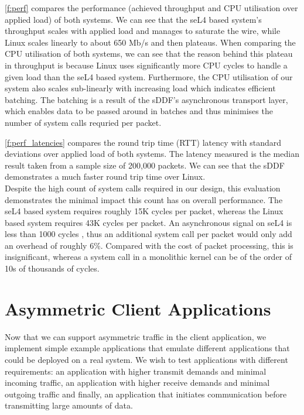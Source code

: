 \autoref{f:perf} compares the performance (achieved throughput and CPU utilisation over applied load) of both systems. 
We can see that the seL4 based system's throughput scales with applied load and manages to saturate the wire, while
Linux scales linearly to about 650 Mb/s and then plateaus. When comparing the CPU utilisation of both systems, we
can see that the reason behind this plateau in throughput is because Linux uses significantly more CPU cycles 
to handle a given load than the seL4 based system. Furthermore, the CPU utilisation of our system also scales 
sub-linearly with increasing load which indicates efficient batching. The batching is a result of the sDDF's asynchronous 
transport layer, which enables data to be passed around in batches and thus minimises the number of system calls requried per packet.

\autoref{f:perf_latencies} compares the round trip time (RTT) latency with standard deviations over applied load of both systems. The latency measured
is the median result taken from a sample size of 200,000 packets. We can see that the sDDF demonstrates a much faster round trip time over Linux.\\

Despite the high count of system calls required in our design, this evaluation demonstrates the minimal impact this count has on overall performance. 
The seL4 based system requires roughly 15K cycles per packet, whereas the Linux based system requires 43K cycles per packet. An asynchronous signal on seL4
is less than 1000 cycles \cite{seL4bench_23}, thus an additional system call per packet would only add an overhead of roughly 6\%. Compared with the cost
of packet processing, this is insignificant, whereas a system call in a monolithic kernel can be of the order of 10s of thousands of cycles. 

\section{Asymmetric Client Applications}

Now that we can support asymmetric traffic in the client application, we implement simple example applications that emulate different
applications that could be deployed on a real system. We wish to test applications with different requirements: 
an application with higher transmit demands and minimal incoming traffic, an application with higher receive demands and minimal outgoing traffic
and finally, an application that initiates communication before transmitting large amounts of data.

